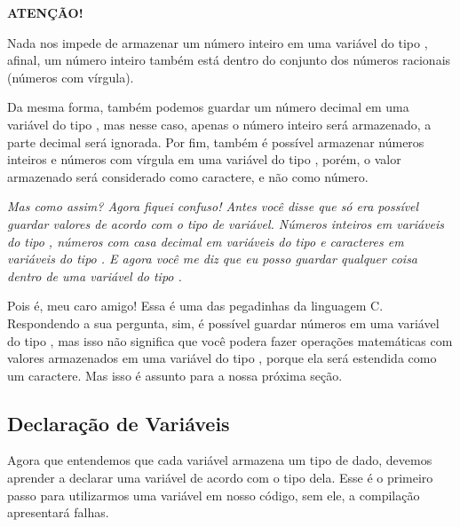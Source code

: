\documentclass[conference]{IEEEtran}
\begin{document}
    \begin{center}
        \textbf{\color{red}ATENÇÃO!}
    \end{center}
    \par
    Nada nos impede de armazenar um número inteiro em uma variável do tipo {}, afinal, um número inteiro também está dentro do conjunto dos números racionais (números com vírgula).
    \par
    Da mesma forma, também podemos guardar um número decimal em uma variável do tipo {}, mas nesse caso, apenas o número inteiro será armazenado, a parte decimal será ignorada. Por fim, também é possível armazenar números inteiros e números com vírgula em uma variável do tipo {}, porém, o valor armazenado será considerado como caractere, e não como número.
    \par
    \textit{Mas como assim? Agora fiquei confuso! Antes você disse que só era possível guardar valores de acordo com o tipo de variável. Números inteiros em variáveis do tipo {}, números com casa decimal em variáveis do tipo {} e caracteres em variáveis do tipo {}. E agora você me diz que eu posso guardar qualquer coisa dentro de uma variável do tipo {}.}
    \par
    Pois é, meu caro amigo! Essa é uma das pegadinhas da linguagem C. Respondendo a sua pergunta, sim, é possível guardar números em uma variável do tipo {}, mas isso não significa que você podera fazer operações matemáticas com valores armazenados em uma variável do tipo {}, porque ela será estendida como um caractere. Mas isso é assunto para a nossa próxima seção.
    \begin{center}
        \subsection{Declaração de Variáveis}
    \end{center}
    \par
    Agora que entendemos que cada variável armazena um tipo de dado, devemos aprender a declarar uma variável de acordo com o tipo dela. Esse é o primeiro passo para utilizarmos uma variável em nosso código, sem ele, a compilação apresentará falhas.
\end{document}
